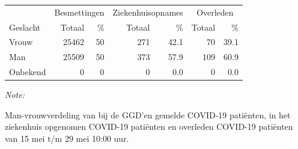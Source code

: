\documentclass[
  english,
  man,floatsintext]{apa6}
\begin{document}
\begin{table}
\centering\begingroup\fontsize{11}{13}\selectfont

\begin{threeparttable}
\begin{tabular}{lrrrrrr}
\toprule
\multicolumn{1}{c}{ } & \multicolumn{2}{c}{Besmettingen} & \multicolumn{2}{c}{Ziekenhuisopnames} & \multicolumn{2}{c}{Overleden} \\
\cmidrule(l{3pt}r{3pt}){2-3} \cmidrule(l{3pt}r{3pt}){4-5} \cmidrule(l{3pt}r{3pt}){6-7}
Geslacht & Totaal & \% & Totaal & \% & Totaal & \%\\
\midrule
Vrouw & 25462 & 50 & 271 & 42.1 & 70 & 39.1\\
Man & 25509 & 50 & 373 & 57.9 & 109 & 60.9\\
Onbekend & 0 & 0 & 0 & 0.0 & 0 & 0.0\\
\bottomrule
\end{tabular}
\begin{tablenotes}
\item \textit{Note: } 
\item Man-vrouwverdeling van bij de GGD’en gemelde COVID-19 patiënten, in het ziekenhuis opgenomen COVID-19 patiënten en overleden COVID-19 patiënten van 15 mei t/m 29 mei 10:00 uur.
\end{tablenotes}
\end{threeparttable}
\endgroup{}
\end{table}
\newpage
\end{document}
